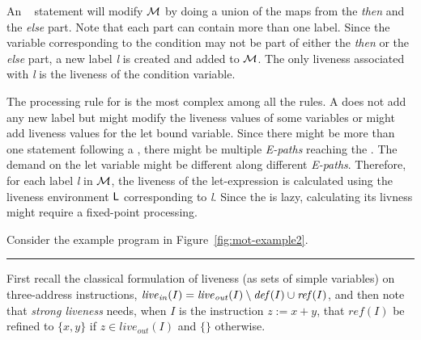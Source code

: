 \documentclass[10pt]{sigplanconf}
\begin{document}
  An \SIF~ statement will modify  $\cal{M}$ by doing a union of 
  the maps from the {\em then} and the {\em else} part. Note that each part can contain 
  more than one label. Since the variable corresponding to the condition may not
  be part of either the {\em then} or the {\em else} part, a new label {\em l} is created 
  and added to $\cal{M}$. The only liveness associated with {\em l} is the liveness 
  of the condition variable.
  
  The processing rule for {\LET} is the most complex among all the rules. A {\LET} does
  not add any new label but might modify the liveness values of some variables or might add 
  liveness values for the let bound variable. Since there might be more than one {\RETURN} 
  statement following a {\LET}, there might be multiple {\em E-paths} reaching the {\LET}.
  The demand on the let variable might be different along different {\em E-paths}. Therefore,
  for each label {\em l} in $\cal{M}$, the liveness of the let-expression is calculated using 
  the liveness environment $\mathsf{L}$ corresponding to {\em l}. Since the {\LET} is lazy, 
  calculating its livness might require a fixed-point processing.

  Consider the example program in Figure~\ref{fig:mot-example2}.
  

\bigskip
\hrule 
\bigskip

First recall the classical formulation  of liveness (as sets of simple
variables)        on        three-address       instructions,        $
\mathit{live}_\mathit{in}(I) = \mathit{live}_\mathit{out}(I) \setminus
\mathit{def\/}(I) \cup  \mathit{ref\/}(I) $,  and then note  that {\em
  strong liveness}  needs, when $I$ is the  instruction $z:=x+y$, that
$\mathit{ref}(I)$     be     refined     to    $\{x,y\}$     if     $z
\in\mathit{live}_\mathit{out}(I)$ and $\{\}$ otherwise.
\end{document}
